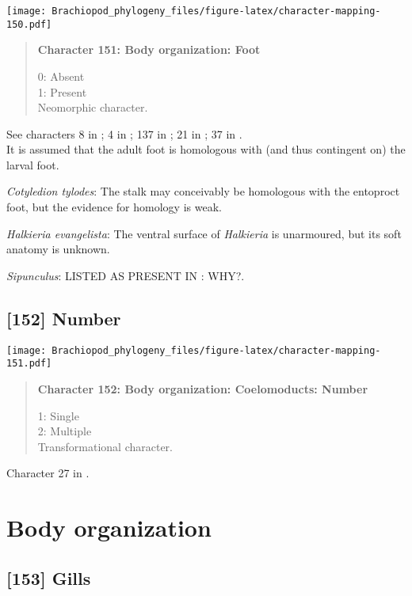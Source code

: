 \documentclass[openany]{book}
\theoremstyle{definition}
\theoremstyle{definition}
\theoremstyle{definition}
\theoremstyle{remark}
\begin{document}
\texttt{[image: Brachiopod\_phylogeny\_files/figure-latex/character-mapping-150.pdf]}

\begin{quote}
\textbf{Character 151: Body organization: Foot}

0: Absent\\
1: Present\\
Neomorphic character.
\end{quote}

See characters 8 in \citet{Haszprunar1996}; 4 in \citet{Vinther2008};
137 in \citet{Rouse1999}; 21 in \citet{BucklandNicks2008}; 37 in
\citet{Sutton2012}.\\
It is assumed that the adult foot is homologous with (and thus
contingent on) the larval foot.

\hypertarget{Cotyledion_tylodes-coding-151}{}
\emph{Cotyledion tylodes}: The stalk may conceivably be homologous with
the entoproct foot, but the evidence for homology is weak.

\hypertarget{Halkieria_evangelista-coding-151}{}
\emph{Halkieria evangelista}: The ventral surface of \emph{Halkieria} is
unarmoured, but its soft anatomy is unknown.

\hypertarget{Sipunculus-coding-151}{}
\emph{Sipunculus}: LISTED AS PRESENT IN \citet{Smith2012}: WHY?.

\subsection*{{[}152{]} Number}\label{number-1}

\texttt{[image: Brachiopod\_phylogeny\_files/figure-latex/character-mapping-151.pdf]}

\begin{quote}
\textbf{Character 152: Body organization: Coelomoducts: Number}

1: Single\\
2: Multiple\\
Transformational character.
\end{quote}

Character 27 in \citet{Haszprunar2000}.

\section{Body organization}\label{body-organization-1}

\subsection*{{[}153{]} Gills}\label{gills}
\end{document}
